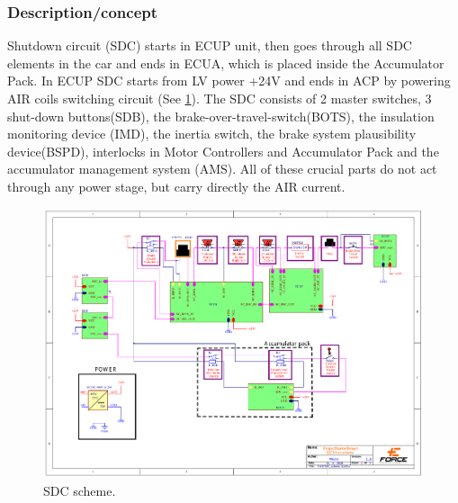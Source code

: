 
\subsubsection{Description/concept}

Shutdown circuit (SDC) starts in ECUP unit, then goes through all SDC elements in the car and ends in ECUA, which is placed inside the Accumulator Pack. In ECUP SDC starts from LV power +24V and ends in ACP by powering AIR coils switching circuit (See \ref{fig:SDC-scheme}). The SDC consists of 2 master switches, 3 shut-down buttons(SDB), the brake-over-travel-switch(BOTS), the insulation monitoring device (IMD), the inertia switch, the brake system plausibility device(BSPD), interlocks in Motor Controllers and Accumulator Pack and the accumulator management system (AMS). All of these crucial parts do not act through any power stage, but carry directly the AIR current.

\begin{figure}[H]
	\includegraphics[width=\textwidth, trim={2cm 3cm 2cm 2cm},clip]{./img/SDC-scheme.pdf}
	\caption{SDC scheme.}
	\label{fig:SDC-scheme}
\end{figure}

